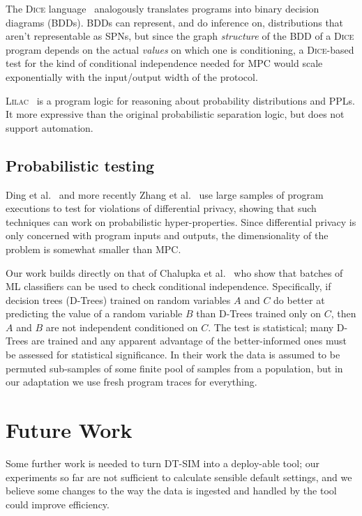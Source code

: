 \documentclass[compsoc, conference, a4paper, 10pt, times]{IEEEtran}
\newcommand{\toolname}{\textsc{DT-SIM}\xspace}
\begin{document}
The \textsc{Dice} language~\cite{holtzen2020scaling} analogously translates programs into binary decision diagrams (BDDs).
BDDs can represent, and do inference on, distributions that aren't representable as SPNs,
but since the graph \textit{structure} of the BDD of a \textsc{Dice} program depends on the actual \textit{values} on which one is conditioning,
a \textsc{Dice}-based test for the kind of conditional independence needed for MPC would scale exponentially with the input/output width of the protocol.

\textsc{Lilac}~\cite{li2023lilac} %
is a program logic for reasoning about probability distributions and PPLs.
It more expressive than the original probabilistic separation logic,
but does not support automation.


\subsection{Probabilistic testing}

Ding et al.~\cite{ding2018detecting} %
and more recently Zhang et al.~\cite{zhang2020testing} %
use large samples of program executions to test for violations of differential privacy,
showing that such techniques can work on probabilistic hyper-properties.
Since differential privacy is only concerned with program inputs and outputs,
the dimensionality of the problem is somewhat smaller than MPC.

Our work builds directly on that of Chalupka et al.~\cite{chalupka2018fast}
who show that batches of ML classifiers can be used to check conditional independence.
Specifically, if decision trees (D-Trees) trained on random variables $A$ and $C$
do better at predicting the value of a random variable $B$ than D-Trees trained only on $C$,
then $A$ and $B$ are not independent conditioned on $C$.
The test is statistical; many D-Trees are trained and any apparent advantage of the better-informed ones must be assessed for statistical significance.
In their work the data is assumed to be permuted sub-samples of some finite pool of samples from a population,
but in our adaptation we use fresh program traces for everything.

\section{Future Work}

Some further work is needed to turn \toolname into a deploy-able tool;
our experiments so far are not sufficient to calculate sensible default settings,
and we believe some changes to the way the data is ingested and handled by the tool could improve efficiency.
\end{document}

